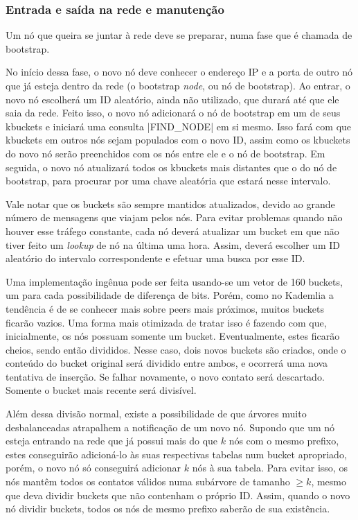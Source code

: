 
\subsubsection*{Entrada e saída na rede e manutenção}

Um nó que queira se juntar à rede deve se preparar, numa fase que é chamada de
\gls{bootstrap}.

No início dessa fase, o novo nó deve conhecer o endereço IP e a porta de outro nó que já
esteja dentro da rede (o \gls*{bootstrap} \emph{node}, ou nó de \gls*{bootstrap}). Ao
entrar, o novo nó escolherá um ID aleatório, ainda não utilizado, que durará até que ele
saia da rede. Feito isso, o novo nó adicionará o nó de \gls*{bootstrap} em um de seus
\glspl*{kbucket} e iniciará uma consulta \bverb|FIND_NODE| em si mesmo. Isso fará com
que \glspl*{kbucket} em outros nós sejam populados com o novo ID, assim como os
\glspl*{kbucket} do novo nó serão preenchidos com os nós entre ele e o nó de
\gls*{bootstrap}. Em seguida, o novo nó atualizará todos os \glspl*{kbucket} mais
distantes que o do nó de \gls*{bootstrap}, para procurar por uma chave aleatória que
estará nesse intervalo.

Vale notar que os \glspl*{bucket} são sempre mantidos atualizados, devido ao grande
número de mensagens que viajam pelos nós. Para evitar problemas quando não houver esse
tráfego constante, cada nó deverá atualizar um \gls*{bucket} em que não tiver feito um
\emph{lookup} de nó na última uma hora. Assim, deverá escolher um ID aleatório do
intervalo correspondente e efetuar uma busca por esse ID.

Uma implementação ingênua pode ser feita usando-se um vetor de 160 \glspl*{bucket}, um
para cada possibilidade de diferença de bits. Porém, como no Kademlia a tendência é de
se conhecer mais sobre \glspl*{peer} mais próximos, muitos \glspl*{bucket} ficarão
vazios. Uma forma mais otimizada de tratar isso é fazendo com que, inicialmente, os nós
possuam somente um \gls*{bucket}. Eventualmente, estes ficarão cheios, sendo então
divididos. Nesse caso, dois novos \glspl*{bucket} são criados, onde o conteúdo do
\gls*{bucket} original será dividido entre ambos, e ocorrerá uma nova tentativa de
inserção. Se falhar novamente, o novo contato será descartado. Somente o \gls*{bucket}
mais recente será divisível.

\newpage

Além dessa divisão normal, existe a possibilidade de que árvores muito desbalanceadas
atrapalhem a notificação de um novo nó. Supondo que um nó esteja entrando na rede que
já possui mais do que $k$ nós com o mesmo prefixo, estes conseguirão adicioná-lo às
suas respectivas tabelas num \gls*{bucket} apropriado, porém, o novo nó só conseguirá
adicionar $k$ nós à sua tabela. Para evitar isso, os nós mantêm todos os contatos
válidos numa subárvore de tamanho $\geq k$, mesmo que deva dividir \glspl*{bucket} que
não contenham o próprio ID. Assim, quando o novo nó dividir \glspl*{bucket}, todos os
nós de mesmo prefixo saberão de sua existência.

